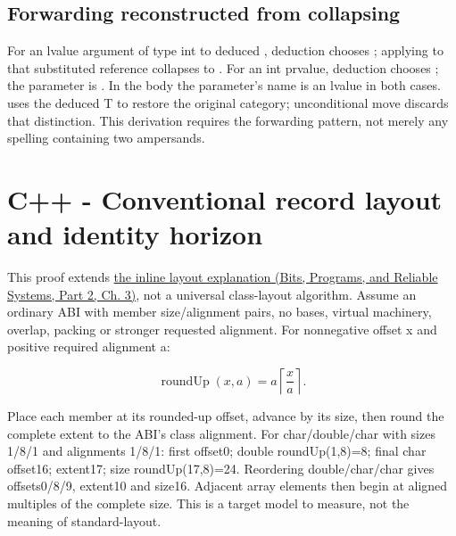 \subsection{Forwarding reconstructed from collapsing}\label{03-visual-computing-i-ch018-forwarding-reconstructed-from-collapsing}

\hypertarget{03-visual-computing-i-ch018-forwarding-reconstructed-from-collapsing}{}

For an lvalue argument of type int to deduced , deduction chooses ; applying \BookInlineCode{{\&}{\&}}{\&\&} to that substituted reference collapses to . For an int prvalue, deduction chooses ; the parameter is . In the body the parameter's name is an lvalue in both cases.  uses the deduced T to restore the original category; unconditional move discards that distinction. This derivation requires the forwarding pattern, not merely any spelling containing two ampersands.

\section{C++ - Conventional record layout and identity horizon}\label{03-visual-computing-i-ch018-c---conventional-record-layout-and-identity-horizon}

\hypertarget{03-visual-computing-i-ch018-c---conventional-record-layout-and-identity-horizon}{}

This proof extends \href{../01-Bits-Programs-and-Reliable-Systems-P02/main.pdf\#nameddest=01-foundations-i-ch003-bringing-the-object-model-back-to-bytes}{the inline layout explanation (Bits, Programs, and Reliable Systems, Part 2, Ch. 3)}, not a universal class-layout algorithm. Assume an ordinary ABI with member size/alignment pairs, no bases, virtual machinery, overlap, packing or stronger requested alignment. For nonnegative offset x and positive required alignment a:

\[
\operatorname{roundUp}(x,a)=a\left\lceil\frac{x}{a}\right\rceil.
\]

Place each member at its rounded-up offset, advance by its size, then round the complete extent to the ABI's class alignment. For char/double/char with sizes 1/8/1 and alignments 1/8/1: first offset0; double roundUp(1,8)=8; final char offset16; extent17; size roundUp(17,8)=24. Reordering double/char/char gives offsets0/8/9, extent10 and size16. Adjacent array elements then begin at aligned multiples of the complete size. This is a target model to measure, not the meaning of standard-layout.

